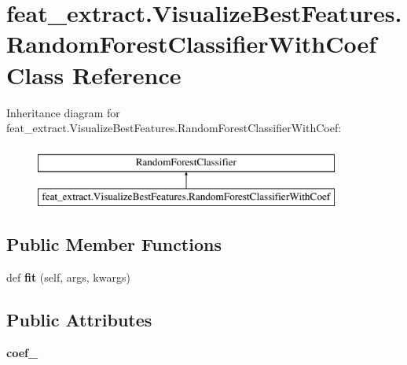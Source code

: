 \hypertarget{classfeat__extract_1_1_visualize_best_features_1_1_random_forest_classifier_with_coef}{}\section{feat\+\_\+extract.\+Visualize\+Best\+Features.\+Random\+Forest\+Classifier\+With\+Coef Class Reference}
\label{classfeat__extract_1_1_visualize_best_features_1_1_random_forest_classifier_with_coef}
Inheritance diagram for feat\+\_\+extract.\+Visualize\+Best\+Features.\+Random\+Forest\+Classifier\+With\+Coef\+:\begin{figure}[H]
\begin{center}
\leavevmode
\includegraphics[height=2.000000cm]{classfeat__extract_1_1_visualize_best_features_1_1_random_forest_classifier_with_coef}
\end{center}
\end{figure}
\subsection*{Public Member Functions}
\begin{DoxyCompactItemize}
\item 
\hypertarget{classfeat__extract_1_1_visualize_best_features_1_1_random_forest_classifier_with_coef_af267a720e308ed33d88a23971aad76bf}{}def {\bfseries fit} (self, args, kwargs)\label{classfeat__extract_1_1_visualize_best_features_1_1_random_forest_classifier_with_coef_af267a720e308ed33d88a23971aad76bf}

\end{DoxyCompactItemize}
\subsection*{Public Attributes}
\begin{DoxyCompactItemize}
\item 
\hypertarget{classfeat__extract_1_1_visualize_best_features_1_1_random_forest_classifier_with_coef_a9d7cd74973f72abcb96e70accfb4454c}{}{\bfseries coef\+\_\+}\label{classfeat__extract_1_1_visualize_best_features_1_1_random_forest_classifier_with_coef_a9d7cd74973f72abcb96e70accfb4454c}

\end{DoxyCompactItemize}


